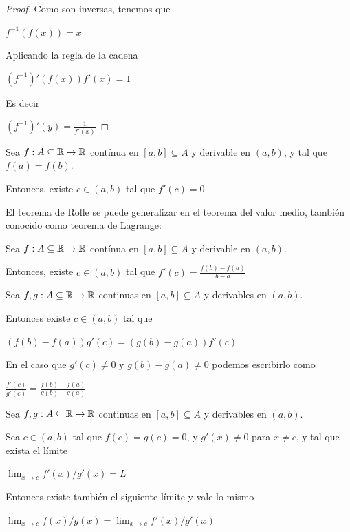 \begin{proof}


Como son inversas, tenemos que

$f^{-1}(f(x)) = x$

Aplicando la regla de la cadena

$(f^{-1})'(f(x)) f'(x) = 1$

Es decir

$(f^{-1})'(y) = \frac{1}{f'(x)}$
\end{proof}


\begin{theorem}[Rolle]
Sea $f : A \subseteq \mathbb{R} \to \mathbb{R}$ contínua en $[a,b] \subseteq A$ y derivable en $(a,b)$, y tal que $f(a) = f(b)$.

Entonces, existe $c \in (a,b)$ tal que $f'(c) = 0$
\end{theorem}

El teorema de Rolle se puede generalizar en el teorema del valor medio, también conocido como teorema de Lagrange:

\begin{theorem}
Sea $f : A \subseteq \mathbb{R} \to \mathbb{R}$ contínua en $[a,b] \subseteq A$ y derivable en $(a,b)$.

Entonces, existe $c \in (a,b)$ tal que $f'(c) = \frac{ f(b) - f(a) }{ b - a }$
\end{theorem}

\begin{theorem}[Cauchy]
Sea $f,g : A \subseteq \mathbb{R} \to \mathbb{R}$ continuas en $[a,b] \subseteq A$ y derivables en $(a,b)$.

Entonces existe $c \in (a,b)$ tal que

$(f(b) - f(a)) g'(c) = (g(b) - g(a)) f'(c) $

En el caso que $g'(c) \neq 0$ y $g(b) - g(a) \neq 0$ podemos escribirlo como

$ \frac{f'(c)}{g'(c)} = \frac{f(b) - f(a)}{g(b) - g(a)} $
\end{theorem}

\begin{theorem}[L'Hopital]
Sea $f,g : A \subseteq \mathbb{R} \to \mathbb{R}$ continuas en $[a,b] \subseteq A$ y derivables en $(a,b)$.

Sea $c \in (a,b)$ tal que $f(c) = g(c) = 0$, y $g'(x) \neq 0$ para $x \neq c$, y tal que exista el límite

$ \lim_{x \to c} f'(x)/g'(x) = L$

Entonces existe también el siguiente límite y vale lo mismo

$ \lim_{x \to c} f(x)/g(x) = \lim_{x \to c} f'(x)/g'(x)$
\end{theorem}

